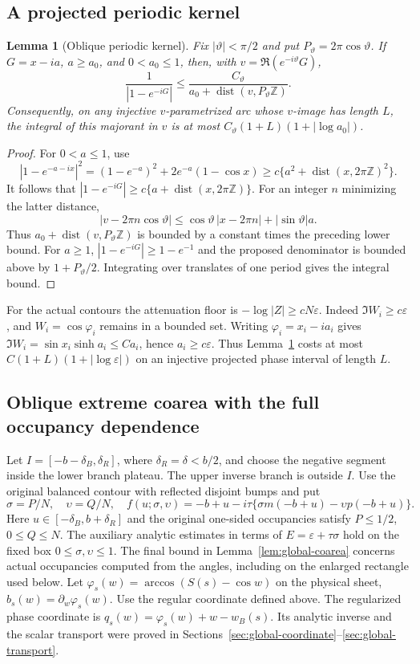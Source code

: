 \documentclass[11pt]{article}
\numberwithin{equation}{section}
\newtheorem{lemma}[theorem]{Lemma}
\theoremstyle{remark}\newtheorem{remark}[theorem]{Remark}
\begin{document}
\subsection{A projected periodic kernel}
\begin{lemma}[Oblique periodic kernel]\label{lem:oblique-kernel}
Fix $|\vartheta|<\pi/2$ and put $P_\vartheta=2\pi\cos\vartheta$.
If $G=x-ia$, $a\ge a_0$, and $0<a_0\le1$, then, with
$v=\Re(e^{-i\vartheta}G)$,
\[
 \frac1{|1-e^{-iG}|}
 \le \frac{C_\vartheta}
 {a_0+\operatorname{dist}(v,P_\vartheta\mathbb Z)}.
\]
Consequently, on any injective $v$-parametrized arc whose
$v$-image has length $L$, the integral of this majorant in $v$
is at most $C_\vartheta(1+L)(1+|\log a_0|)$.
\end{lemma}
\begin{proof}
For $0<a\le1$, use
\[
 |1-e^{-a-ix}|^2=(1-e^{-a})^2+2e^{-a}(1-\cos x)
 \ge c\{a^2+\operatorname{dist}(x,2\pi\mathbb Z)^2\}.
\]
It follows that
$|1-e^{-iG}|\ge c\{a+\operatorname{dist}(x,2\pi\mathbb Z)\}$.
For an integer $n$ minimizing the latter distance,
\[
 |v-2\pi n\cos\vartheta|
 \le\cos\vartheta\,|x-2\pi n|+|\sin\vartheta|a.
\]
Thus $a_0+\operatorname{dist}(v,P_\vartheta\mathbb Z)$ is
bounded by a constant times the preceding lower bound.
For $a\ge1$, $|1-e^{-iG}|\ge1-e^{-1}$ and the proposed
denominator is bounded above by $1+P_\vartheta/2$.
Integrating over translates of one period gives the integral bound.
\end{proof}


For the actual contours the attenuation floor is
$-\log|Z|\ge cN\varepsilon$. Indeed $\Im W_i\ge c\varepsilon$,
and $W_i=\cos\varphi_i$ remains in a bounded set. Writing
$\varphi_i=x_i-ia_i$ gives
$\Im W_i=\sin x_i\sinh a_i\le C a_i$, hence
$a_i\ge c\varepsilon$. Thus Lemma~\ref{lem:oblique-kernel}
costs at most $C(1+L)(1+|\log\varepsilon|)$ on an injective
projected phase interval of length $L$.

\subsection{Oblique extreme coarea with the full occupancy dependence}

Let $I=[-b-\delta_B,\delta_R]$, where $\delta_R=\delta<b/2$,
and choose the negative segment inside the lower branch plateau.
The upper inverse branch is outside $I$.  Use the original balanced
contour with reflected disjoint bumps and put
\[
 \sigma=P/N,\quad\upsilon=Q/N,\quad
 f(u;\sigma,\upsilon)
 =-b+u-i\tau\{\sigma m(-b+u)-\upsilon p(-b+u)\}.
\]
Here $u\in[-\delta_B,b+\delta_R]$ and the original one-sided
occupancies satisfy $P\le1/2$, $0\le Q\le N$.
The auxiliary analytic estimates in terms of $E=\varepsilon+\tau\sigma$
hold on the fixed box $0\le\sigma,\upsilon\le1$.
The final bound in Lemma~\ref{lem:global-coarea} concerns actual
occupancies computed from the angles, including on the enlarged
rectangle used below.
Let $\varphi_s(w)=\arccos(S(s)-\cos w)$ on the physical sheet,
$b_s(w)=\partial_w\varphi_s(w)$. Use the regular coordinate
defined above.
The regularized phase coordinate is
$q_s(w)=\varphi_s(w)+w-w_B(s)$.
Its analytic inverse and the scalar transport were proved in
Sections~\ref{sec:global-coordinate}--\ref{sec:global-transport}.
\end{document}

